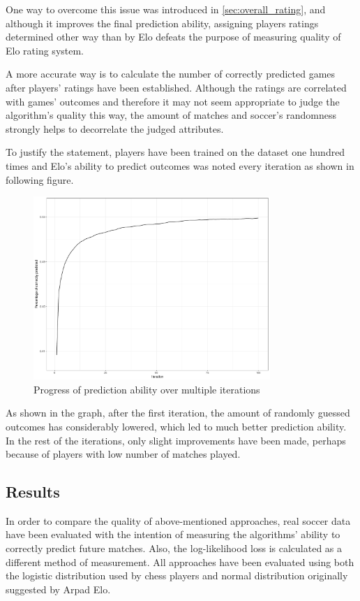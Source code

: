 One way to overcome this issue was introduced in \ref{sec:overall_rating}, and although it improves the final prediction ability, assigning players ratings determined other way than by Elo defeats the purpose of measuring quality of Elo rating system.

A more accurate way is to calculate the number of correctly predicted games after players' ratings have been established. Although the ratings are correlated with games' outcomes and therefore it may not seem appropriate to judge the algorithm's quality this way, the amount of matches and soccer's randomness strongly helps to decorrelate the judged attributes.

To justify the statement, players have been trained on the dataset one hundred times and Elo's ability to predict outcomes was noted every iteration as shown in following figure.

\begin{figure}[H]
\centering
\includegraphics[width=0.8\textwidth]{figs/multiple_trainings}
\caption{Progress of prediction ability over multiple iterations}
\end{figure}

As shown in the graph, after the first iteration, the amount of randomly guessed outcomes has considerably lowered, which led to much better prediction ability. In the rest of the iterations, only slight improvements have been made, perhaps because of players with low number of matches played.

\subsection{Results}
In order to compare the quality of above-mentioned approaches, real soccer data have been evaluated with the intention of measuring the algorithms' ability to correctly predict future matches. Also, the log-likelihood loss is calculated as a different method of measurement. All approaches have been evaluated using both the logistic distribution used by chess players and normal distribution originally suggested by Arpad Elo.

